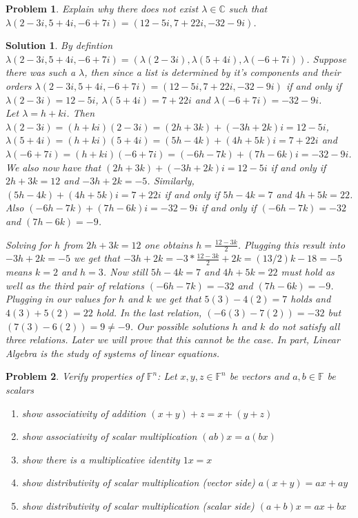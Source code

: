 \documentclass{article}
\theoremstyle{problemstyle}
\newtheorem{problem}{Problem}
\theoremstyle{problemstyle}
\newtheorem{solution}{Solution}
\begin{document}
\begin{problem}
Explain why there does not exist $\lambda \in \mathbb{C}$ such that $\lambda(2-3i,5+4i,-6+7i) = (12-5i,7+22i,-32-9i)$.
\end{problem}
\begin{solution}
By defintion $\lambda(2-3i,5+4i,-6+7i) = (\lambda(2-3i),\lambda(5+4i),\lambda(-6+7i))$. Suppose there was such a $\lambda$, then since a list is determined by it's components and their orders $\lambda(2-3i,5+4i,-6+7i) = (12-5i,7+22i,-32-9i)$ if and only if $\lambda(2-3i) = 12-5i$, $\lambda(5+4i) =7+22i$ and $\lambda(-6+7i) = -32-9i$.\\
Let $\lambda = h+ki$. Then $\lambda(2-3i) = (h+ki)(2-3i) = (2h+3k)+(-3h+2k)i=12-5i$, $\lambda(5+4i)=(h+ki)(5+4i) = (5h-4k)+(4h+5k)i=7+22i$ and $\lambda(-6+7i) = (h+ki)(-6+7i)=(-6h-7k)+(7h-6k)i=-32-9i$.\\

We also now have that $(2h+3k)+(-3h+2k)i=12-5i$ if and only if $2h+3k = 12$ and $-3h+2k = -5$. Similarly, $(5h-4k)+(4h+5k)i=7+22i$ if and only if $5h-4k = 7$ and $4h+5k=22$. Also  $(-6h-7k)+(7h-6k)i=-32-9i$ if and only if $(-6h-7k) = -32$ and $(7h-6k) = -9$. 

Solving for $h$ from $2h+3k = 12$ one obtains $h = \frac{12-3k}{2}$. Plugging this result into $-3h+2k = -5$ we get that $-3h+2k = -3*\frac{12-3k}{2}+2k = (13/2)k-18 = -5$ means $k = 2$ and $h = 3$. Now still $5h-4k = 7$ and $4h+5k=22$ must hold as well as the third pair of relations $(-6h-7k) = -32$ and $(7h-6k) = -9$. Plugging in our values for $h$ and $k$ we get that $5(3)-4(2) = 7$ holds and $4(3)+5(2)=22$ hold. In the last relation, $(-6(3)-7(2)) = -32$ but $(7(3)-6(2)) =9 \neq -9$. Our possible solutions $h$ and $k$ do not satisfy all three relations. Later we will prove that this cannot be the case. In part, Linear Algebra is the study of systems of linear equations. 
\end{solution}

\begin{problem}
Verify properties of $\mathbb{F}^n$: 
Let $x,y,z\in\mathbb{F}^n$ be vectors and $a,b\in\mathbb{F}$ be scalars
\begin{enumerate}
\item show associativity of addition $(x+y)+z = x+(y+z)$
\item show associativity of scalar multiplication $(ab)x = a(bx)$
\item show there is a multiplicative identity $1x=x$ 
\item show distributivity of scalar multiplication (vector side) $a(x+y) = ax + ay$
\item show distributivity of scalar multiplication (scalar side)  $(a+b)x = ax + bx$
\end{enumerate}
\end{problem}
\end{document}
